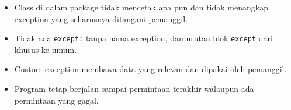 \begin{penting}
\begin{itemize}
  \item Class di dalam package tidak mencetak apa pun dan tidak menangkap exception yang seharusnya ditangani pemanggil.
  \item Tidak ada \texttt{except:} tanpa nama exception, dan urutan blok \texttt{except} dari khusus ke umum.
  \item Custom exception membawa data yang relevan dan dipakai oleh pemanggil.
  \item Program tetap berjalan sampai permintaan terakhir walaupun ada permintaan yang gagal.
\end{itemize}
\end{penting}